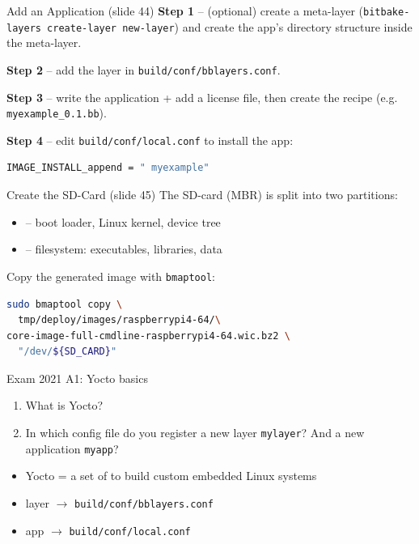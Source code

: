 \begin{KR}{Add an Application (slide 44)}
    \textbf{Step 1} -- (optional) create a meta-layer
    (\texttt{bitbake-layers create-layer new-layer}) and create the app's
    directory structure inside the meta-layer.

    \textbf{Step 2} -- add the layer in \texttt{build/conf/bblayers.conf}.

    \textbf{Step 3} -- write the application + add a license file, then create the
    recipe (e.g. \texttt{myexample\_0.1.bb}).

    \textbf{Step 4} -- edit \texttt{build/conf/local.conf} to install the app:
\begin{lstlisting}[language=bash, style=basesmol, aboveskip=2pt, belowskip=2pt]
IMAGE_INSTALL_append = " myexample"
\end{lstlisting}
\end{KR}

\begin{KR}{Create the SD-Card (slide 45)}
    The SD-card (MBR) is split into two partitions:
    \begin{itemize}
        \item {} -- boot loader, Linux kernel, device tree
        \item {} -- filesystem: executables, libraries, data
    \end{itemize}
    Copy the generated image with \texttt{bmaptool}:
\begin{lstlisting}[language=bash, style=basesmol, aboveskip=2pt, belowskip=2pt]
sudo bmaptool copy \
  tmp/deploy/images/raspberrypi4-64/\
core-image-full-cmdline-raspberrypi4-64.wic.bz2 \
  "/dev/${SD_CARD}"
\end{lstlisting}
\end{KR}

\begin{example2}{Exam 2021 A1: Yocto basics}
    \begin{enumerate}
        \item What is Yocto?
        \item In which config file do you register a new layer \texttt{mylayer}?
              And a new application \texttt{myapp}?
    \end{enumerate}
    \tcblower
    \begin{itemize}
        \item Yocto = a set of  to build
              custom embedded Linux systems
        \item layer $\to$ \texttt{build/conf/bblayers.conf}
        \item app $\to$ \texttt{build/conf/local.conf}
    \end{itemize}
\end{example2}

